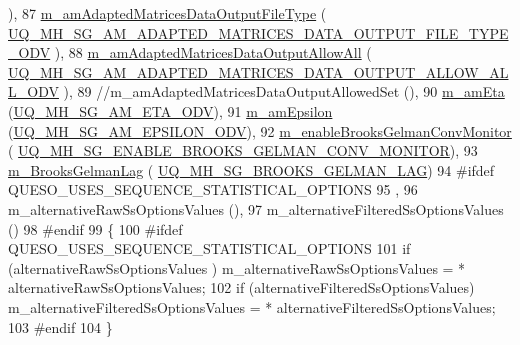 \begin{DoxyCode}
      ),
87   \hyperlink{class_q_u_e_s_o_1_1_mh_options_values_a2aeb0e38d87c86464af4bde6a202598a}{m\_amAdaptedMatricesDataOutputFileType}      (
      \hyperlink{_metropolis_hastings_s_g_options_8h_a60696c3d037fd5cb02bdc3f9e12f2106}{UQ\_MH\_SG\_AM\_ADAPTED\_MATRICES\_DATA\_OUTPUT\_FILE\_TYPE\_ODV}
      ),
88   \hyperlink{class_q_u_e_s_o_1_1_mh_options_values_aa149885c0a566a853626ddae4a31f313}{m\_amAdaptedMatricesDataOutputAllowAll}      (
      \hyperlink{_metropolis_hastings_s_g_options_8h_ad90cbc865c4aa502656a2fd432519fec}{UQ\_MH\_SG\_AM\_ADAPTED\_MATRICES\_DATA\_OUTPUT\_ALLOW\_ALL\_ODV}
      ),
89 \textcolor{comment}{//m\_amAdaptedMatricesDataOutputAllowedSet    (),}
90   \hyperlink{class_q_u_e_s_o_1_1_mh_options_values_ac901ea79ba9b77aae31e3ea07df140b1}{m\_amEta}                                    (\hyperlink{_metropolis_hastings_s_g_options_8h_acbc124514a57e28382a8e311cfb7b996}{UQ\_MH\_SG\_AM\_ETA\_ODV}),
91   \hyperlink{class_q_u_e_s_o_1_1_mh_options_values_af899c001e1bbdaf9c740d6b4dc0e13e0}{m\_amEpsilon}                                (\hyperlink{_metropolis_hastings_s_g_options_8h_a0e40df88a159b01a6a36b223e12a8cee}{UQ\_MH\_SG\_AM\_EPSILON\_ODV}),
92   \hyperlink{class_q_u_e_s_o_1_1_mh_options_values_afae1b3bf96ee3657212fa91ac7859bb7}{m\_enableBrooksGelmanConvMonitor}            (
      \hyperlink{_metropolis_hastings_s_g_options_8h_a613c77a068bcef4aba2d68f03677eaf7}{UQ\_MH\_SG\_ENABLE\_BROOKS\_GELMAN\_CONV\_MONITOR}),
93   \hyperlink{class_q_u_e_s_o_1_1_mh_options_values_a574f8a1d72eb5d45af5ab0c020a69447}{m\_BrooksGelmanLag}                          (
      \hyperlink{_metropolis_hastings_s_g_options_8h_a47c0e6fa59a29fa680a23470018b31b0}{UQ\_MH\_SG\_BROOKS\_GELMAN\_LAG})
94 \textcolor{preprocessor}{#ifdef QUESO\_USES\_SEQUENCE\_STATISTICAL\_OPTIONS}
95 \textcolor{preprocessor}{}  ,
96   m\_alternativeRawSsOptionsValues            (),
97   m\_alternativeFilteredSsOptionsValues       ()
98 \textcolor{preprocessor}{#endif}
99 \textcolor{preprocessor}{}\{
100 \textcolor{preprocessor}{#ifdef QUESO\_USES\_SEQUENCE\_STATISTICAL\_OPTIONS}
101 \textcolor{preprocessor}{}  \textcolor{keywordflow}{if} (alternativeRawSsOptionsValues     ) m\_alternativeRawSsOptionsValues      = *
      alternativeRawSsOptionsValues;
102   \textcolor{keywordflow}{if} (alternativeFilteredSsOptionsValues) m\_alternativeFilteredSsOptionsValues = *
      alternativeFilteredSsOptionsValues;
103 \textcolor{preprocessor}{#endif}
104 \textcolor{preprocessor}{}\}
\end{DoxyCode}
